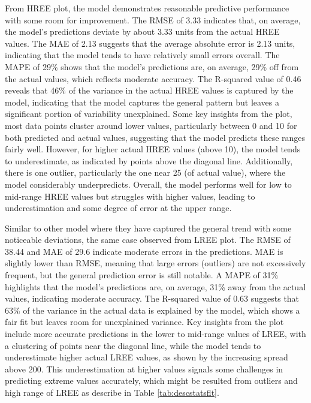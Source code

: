 \documentclass[11pt,a4paper,]{article}
\begin{document}
From HREE plot, the model demonstrates reasonable predictive performance with some room for improvement. The RMSE of 3.33 indicates that, on average, the model's predictions deviate by about 3.33 units from the actual HREE values. The MAE of 2.13 suggests that the average absolute error is 2.13 units, indicating that the model tends to have relatively small errors overall. The MAPE of 29\% shows that the model's predictions are, on average, 29\% off from the actual values, which reflects moderate accuracy. The R-squared value of 0.46 reveals that 46\% of the variance in the actual HREE values is captured by the model, indicating that the model captures the general pattern but leaves a significant portion of variability unexplained. Some key insights from the plot, most data points cluster around lower values, particularly between 0 and 10 for both predicted and actual values, suggesting that the model predicts these ranges fairly well. However, for higher actual HREE values (above 10), the model tends to underestimate, as indicated by points above the diagonal line. Additionally, there is one outlier, particularly the one near 25 (of actual value), where the model considerably underpredicts. Overall, the model performs well for low to mid-range HREE values but struggles with higher values, leading to underestimation and some degree of error at the upper range.

Similar to other model where they have captured the general trend with some noticeable deviations, the same case observed from LREE plot. The RMSE of 38.44 and MAE of 29.6 indicate moderate errors in the predictions. MAE is slightly lower than RMSE, meaning that large errors (outliers) are not excessively frequent, but the general prediction error is still notable. A MAPE of 31\% highlights that the model's predictions are, on average, 31\% away from the actual values, indicating moderate accuracy. The R-squared value of 0.63 suggests that 63\% of the variance in the actual data is explained by the model, which shows a fair fit but leaves room for unexplained variance. Key insights from the plot include more accurate predictions in the lower to mid-range values of LREE, with a clustering of points near the diagonal line, while the model tends to underestimate higher actual LREE values, as shown by the increasing spread above 200. This underestimation at higher values signals some challenges in predicting extreme values accurately, which might be resulted from outliers and high range of LREE as describe in Table \ref{tab:descstatsflt}.
\end{document}
